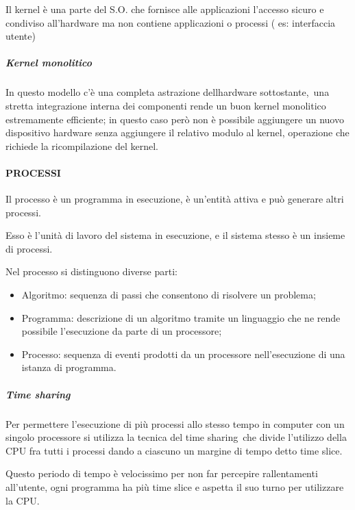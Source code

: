 \documentclass[
]{article}
\providecommand{\tightlist}{%
  \setlength{\itemsep}{0pt}\setlength{\parskip}{0pt}}
\begin{document}
{Il kernel è una parte del S.O. che fornisce alle applicazioni l'accesso
sicuro e condiviso all'hardware ma non contiene applicazioni o processi
( es: interfaccia utente)}

\subparagraph{\texorpdfstring{{Kernel
monolitico}}{Kernel monolitico}}\label{h.sawohzopwcyt}

{In questo modello c'è una }{completa astrazione
dell\textquotesingle hardware sottostante,}{~una stretta integrazione
interna dei componenti rende un buon kernel monolitico }{estremamente
efficiente}{; in questo caso però non è possibile aggiungere un nuovo
dispositivo hardware senza aggiungere il relativo modulo al kernel,
operazione che richiede la ricompilazione del kernel.}

{}

\paragraph{\texorpdfstring{{PROCESSI}}{PROCESSI}}\label{h.cmpk8qf0651u}

{Il processo è un programma in esecuzione, è un'entità attiva e può
generare altri processi. }

{Esso è l'unità di lavoro del sistema in esecuzione, e il sistema stesso
è un insieme di processi.}

{Nel processo si distinguono diverse parti:}

{}

\begin{itemize}
\tightlist
\item
  {Algoritmo}{: sequenza di passi che consentono di risolvere un
  problema;}
\item
  {Programma}{: descrizione di un algoritmo tramite un linguaggio che ne
  rende possibile l'esecuzione da parte di un processore;}
\item
  {Processo}{: sequenza di eventi prodotti da un processore
  nell'esecuzione di una istanza di programma.}
\end{itemize}

\subparagraph{\texorpdfstring{{Time
sharing}}{Time sharing}}\label{h.s5q4kh6b1az8}

{Per permettere l'esecuzione di più processi allo stesso tempo in
computer con un singolo processore si utilizza la tecnica del }{time
sharing}{~che divide l'utilizzo della CPU fra tutti i processi dando a
ciascuno un margine di tempo detto }{time slice}{.}

{Questo periodo di tempo è velocissimo per non far percepire
rallentamenti all'utente, ogni programma ha più time slice e aspetta il
suo turno per utilizzare la CPU.}
\end{document}
